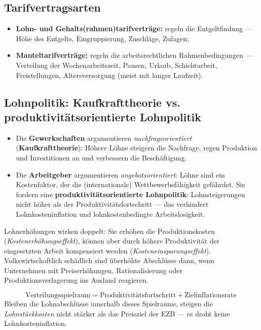 \documentclass[11pt, a4paper]{article}
\begin{document}
\subsection{Tarifvertragsarten}

\begin{itemize}
  \item \textbf{Lohn- und Gehalts(rahmen)tarifverträge:} regeln die Entgeltfindung ---
    Höhe des Entgelts, Eingruppierung, Zuschläge, Zulagen;
  \item \textbf{Manteltarifverträge:} regeln die arbeitsrechtlichen Rahmenbedingungen ---
    Verteilung der Wochenarbeitszeit, Pausen, Urlaub, Schichtarbeit, Freistellungen,
    Altersversorgung (meist mit langer Laufzeit).
\end{itemize}

\subsection{Lohnpolitik: Kaufkrafttheorie vs. produktivitätsorientierte Lohnpolitik}

\begin{itemize}
  \item Die \textbf{Gewerkschaften} argumentieren \emph{nachfrageorientiert}
    (\textbf{Kaufkrafttheorie}): Höhere Löhne steigern die Nachfrage, regen Produktion und
    Investitionen an und verbessern die Beschäftigung.
  \item Die \textbf{Arbeitgeber} argumentieren \emph{angebotsorientiert}: Löhne sind ein
    Kostenfaktor, der die (internationale) Wettbewerbsfähigkeit gefährdet. Sie fordern eine
    \textbf{produktivitätsorientierte Lohnpolitik}: Lohnsteigerungen nicht höher als der
    Produktivitätsfortschritt --- das verhindert Lohnkosteninflation und lohnkostenbedingte
    Arbeitslosigkeit.
\end{itemize}

Lohnerhöhungen wirken doppelt: Sie erhöhen die Produktionskosten
(\emph{Kostenerhöhungseffekt}), können aber durch höhere Produktivität der eingesetzten
Arbeit kompensiert werden (\emph{Kosteneinsparungseffekt}). Volkswirtschaftlich schädlich
sind überhöhte Abschlüsse dann, wenn Unternehmen mit Preiserhöhungen, Rationalisierung oder
Produktionsverlagerung ins Ausland reagieren.

\begin{merksatz}[title={\bfseries Kostenniveauneutraler Verteilungsspielraum}]
\[
\text{Verteilungsspielraum} = \text{Produktivitätsfortschritt} + \text{Zielinflationsrate}
\]
Bleiben die Lohnabschlüsse innerhalb dieses Spielraums, steigen die
\emph{Lohnstückkosten} nicht stärker als das Preisziel der EZB --- es droht keine
Lohnkosteninflation.
\end{merksatz}
\end{document}
